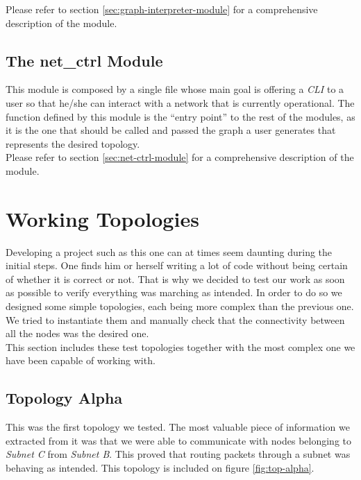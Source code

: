             Please refer to section \ref{sec:graph-interpreter-module} for a comprehensive description of the module.\\

        \subsection{The net\_ctrl Module}
            This module is composed by a single file whose main goal is offering a \textit{CLI} to a user so that he/she can interact with a network that is currently operational. The function defined by this module is the ``entry point'' to the rest of the modules, as it is the one that should be called and passed the graph a user generates that represents the desired topology.\\

            Please refer to section \ref{sec:net-ctrl-module} for a comprehensive description of the module.\\

    \section{Working Topologies} \label{sec:working-tops}
        Developing a project such as this one can at times seem daunting during the initial steps. One finds him or herself writing a lot of code without being certain of whether it is correct or not. That is why we decided to test our work as soon as possible to verify everything was marching as intended. In order to do so we designed some simple topologies, each being more complex than the previous one. We tried to instantiate them and manually check that the connectivity between all the nodes was the desired one.\\

        This section includes these test topologies together with the most complex one we have been capable of working with.\\

        \subsection{Topology Alpha}
            This was the first topology we tested. The most valuable piece of information we extracted from it was that we were able to communicate with nodes belonging to \textit{Subnet C} from \textit{Subnet B}. This proved that routing packets through a subnet was behaving as intended. This topology is included on figure \ref{fig:top-alpha}.\\


